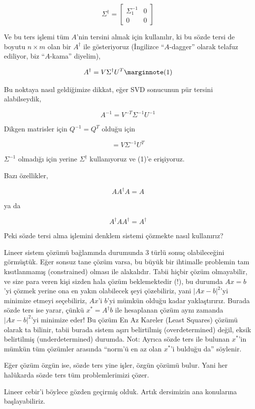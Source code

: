 \documentclass[12pt,fleqn]{article}\usepackage{../../common}
\begin{document}
$$ \Sigma^{\dagger} = \left[\begin{array}{cc}
\Sigma_1^{-1} & 0 \\ 0 & 0 
\end{array}\right]$$

Ve bu ters işlemi tüm $A$'nin tersini almak için kullanılır, ki bu sözde
tersi de boyutu $n \times m$ olan bir $A^{\dagger}$ ile gösteriyoruz
(İngilizce ``$A$-dagger'' olarak telafuz ediliyor, biz ``$A$-kama''
diyelim), 

$$ 
A^{\dagger} = V \Sigma^{\dagger} U^T  
\mlabel{1}
$$

Bu noktaya nasıl geldiğimize dikkat, eğer SVD sonucunun pür tersini
alabilseydik, 

$$ A^{-1} = V^{-T}\Sigma^{-1}U^{-1} $$

Dikgen matrisler için $Q^{-1}=Q^T$ olduğu için 

$$ = V\Sigma^{-1}U^{T} $$

$\Sigma^{-1}$ olmadığı için yerine $\Sigma^{\dagger}$ kullanıyoruz ve (1)'e erişiyoruz.  

Bazı özellikler,

$$ A A^{\dagger} A = A $$

ya da

$$ A^{\dagger} A  A^{\dagger} =  A^{\dagger} $$

Peki sözde tersi alma işlemini denklem sistemi çözmekte nasıl kullanırız? 

Lineer sistem çözümü bağlamında durumunda 3 türlü sonuç olabileceğini
görmüştük. Eğer sonsuz tane çözüm varsa, bu büyük bir ihtimalle problemin
tam kısıtlanmamış (constrained) olması ile alakalıdır. Tabii hiçbir çözüm
olmayabilir, ve size para veren kişi sizden hala çözüm beklemektedir (!),
bu durumda $Ax=b$'yi çözmek yerine ona en yakın olabilecek şeyi
çözebiliriz, yani $|Ax - b|^2$'yi minimize etmeyi seçebiliriz, $Ax$'i
$b$'yi mümkün olduğu kadar yaklaştırırız. Burada sözde ters ise yarar,
çünkü $x^\ast = A^{\dagger}b$ ile hesaplanan çözüm aynı zamanda $|Ax - b|^2$'yi
minimize eder! Bu çözüm En Az Kareler (Least Squares) çözümü olarak ta
bilinir, tabii burada sistem aşırı belirtilmiş (overdetermined) değil,
eksik belirtilmiş (underdetermined) durumda. Not: Ayrıca sözde ters ile
bulunan $x^\ast$'in mümkün tüm çözümler arasında ``norm'ü en az olan $x^\ast$'i
bulduğu da'' söylenir.

Eğer çözüm özgün ise, sözde ters yine işler, özgün çözümü bulur. Yani her
halükarda sözde ters tüm problemlerimizi çözer.

Lineer cebir'i böylece gözden geçirmiş olduk. Artık dersimizin ana
konularına başlayabiliriz. 
\end{document}
